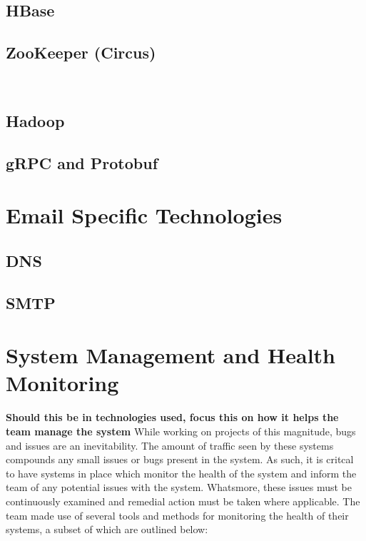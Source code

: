 \subsection{HBase}

\subsection{ZooKeeper (Circus)}\

\subsection{Hadoop}

\subsection{gRPC and Protobuf}


\section{Email Specific Technologies}
\subsection{DNS} \label{sec:DNS}
\subsection{SMTP}

\section{System Management and Health Monitoring}
\textbf{Should this be in technologies used, focus this on how it helps the team manage the system}
While working on projects of this magnitude, bugs and issues are an inevitability. The amount of traffic seen by these systems compounds any small issues or bugs present in the system. As such, it is critcal to have systems in place which monitor the health of the system and inform the team of any potential issues with the system. Whatsmore, these issues must be continuously examined and remedial action must be taken where applicable. The \team{} team made use of several tools and methods for monitoring the health of their systems, a subset of which are outlined below:

